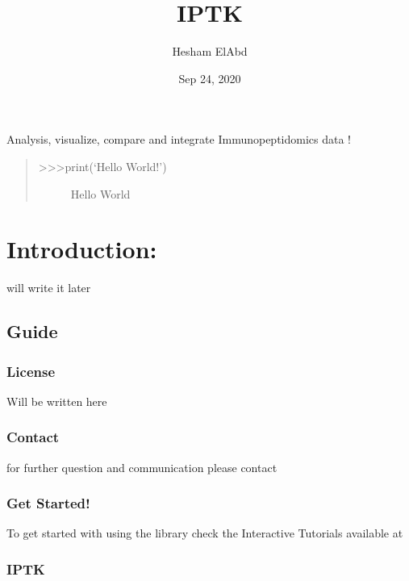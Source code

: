\documentclass[letterpaper,10pt,english]{sphinxmanual}
\title{IPTK}
\date{Sep 24, 2020}
\author{Hesham ElAbd}
\begin{document}
\pagestyle{empty}
\sphinxmaketitle
\pagestyle{plain}
\sphinxtableofcontents
\pagestyle{normal}
\label{\detokenize{index::doc}}


Analysis, visualize, compare and integrate Immunopeptidomics data !
\begin{quote}
\begin{description}
\item[{\textgreater{}\textgreater{}\textgreater{}print(‘Hello World!’)}] \leavevmode
Hello World

\end{description}
\end{quote}


\chapter{Introduction:}
\label{\detokenize{index:introduction}}
will write it later


\section{Guide}
\label{\detokenize{index:guide}}

\subsection{License}
\label{\detokenize{license:license}}\label{\detokenize{license::doc}}
Will be written here


\subsection{Contact}
\label{\detokenize{license:contact}}
for further question and communication please contact 


\subsection{Get Started!}
\label{\detokenize{get_started:get-started}}\label{\detokenize{get_started::doc}}
To get started with using the library check the Interactive Tutorials available at 


\subsection{IPTK}
\label{\detokenize{modules:iptk}}\label{\detokenize{modules::doc}}
\end{document}
